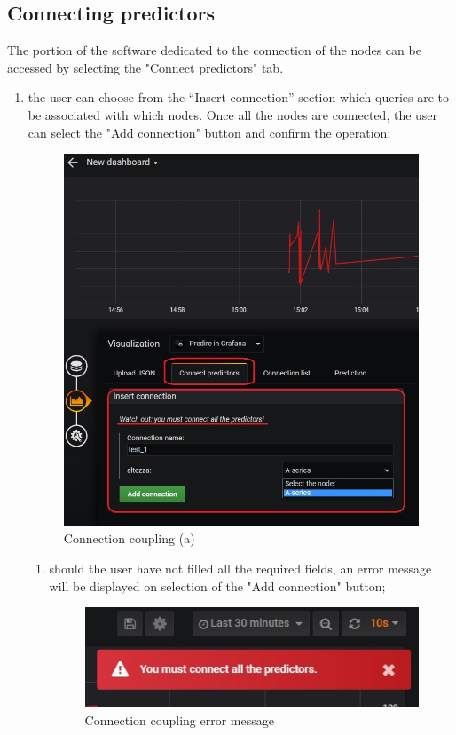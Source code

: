 \subsection{Connecting predictors}
The portion of the software dedicated to the connection of the nodes can be accessed by selecting the "Connect predictors" tab.
\begin{enumerate}
	\item the user can choose from the “Insert connection” section which queries are to be associated with which nodes.
	Once all the nodes are connected, the user can select the "Add connection" button and confirm the operation;
	
\begin{figure}[H]
\centering
\includegraphics[scale=0.75]{img/plug-in/plugin_3.JPG}
\caption{Connection coupling (a)}
\end{figure}



\begin{enumerate}
\item should the user have not filled all the required fields, an error message will be displayed on selection of the "Add connection" button;

	
\begin{figure}[H]
\centering
\includegraphics[scale=0.60]{img/plug-in/plugin_4.JPG}
\caption{Connection coupling error message}
\end{figure}


\end{enumerate}
\end{enumerate}
